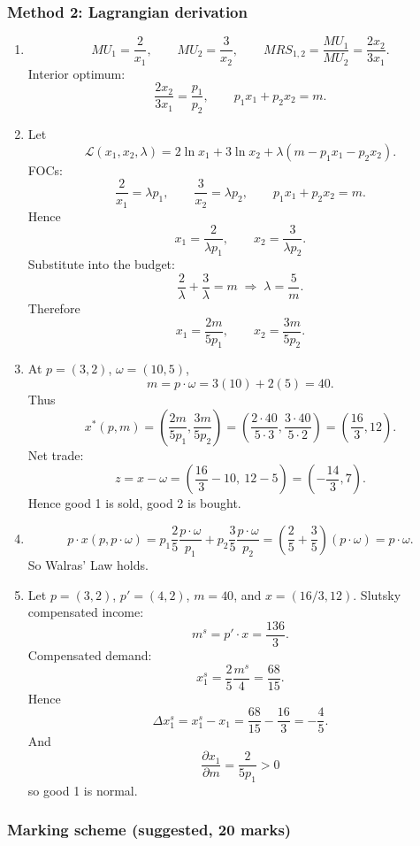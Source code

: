 \documentclass[12pt]{article}
\begin{document}
\newpage
\subsubsection*{Method 2: Lagrangian derivation}

\begin{enumerate}[label=(\alph*)]
\item
\[
MU_1=\frac{2}{x_1},\qquad MU_2=\frac{3}{x_2},\qquad
MRS_{1,2}=\frac{MU_1}{MU_2}=\frac{2x_2}{3x_1}.
\]
Interior optimum:
\[
\frac{2x_2}{3x_1}=\frac{p_1}{p_2},
\qquad p_1x_1+p_2x_2=m.
\]

\item Let
\[
\mathcal L(x_1,x_2,\lambda)=2\ln x_1+3\ln x_2+\lambda(m-p_1x_1-p_2x_2).
\]
FOCs:
\[
\frac{2}{x_1}=\lambda p_1,\qquad \frac{3}{x_2}=\lambda p_2,\qquad p_1x_1+p_2x_2=m.
\]
Hence
\[
x_1=\frac{2}{\lambda p_1},\qquad x_2=\frac{3}{\lambda p_2}.
\]
Substitute into the budget:
\[
\frac{2}{\lambda}+\frac{3}{\lambda}=m
\;\Rightarrow\;
\lambda=\frac{5}{m}.
\]
Therefore
\[
\boxed{x_1=\frac{2m}{5p_1},\qquad x_2=\frac{3m}{5p_2}.}
\]

\item At \(p=(3,2)\), \(\omega=(10,5)\),
\[
m=p\cdot\omega=3(10)+2(5)=40.
\]
Thus
\[
x^*(p,m)=\left(\frac{2m}{5p_1},\frac{3m}{5p_2}\right)
=\left(\frac{2\cdot 40}{5\cdot 3},\frac{3\cdot 40}{5\cdot 2}\right)
=\left(\frac{16}{3},12\right).
\]
Net trade:
\[
z=x-\omega=\left(\frac{16}{3}-10,\ 12-5\right)=\left(-\frac{14}{3},7\right).
\]
Hence good 1 is sold, good 2 is bought.

\item
\[
p\cdot x(p,p\cdot\omega)
=p_1\frac{2}{5}\frac{p\cdot\omega}{p_1}+p_2\frac{3}{5}\frac{p\cdot\omega}{p_2}
=\left(\frac25+\frac35\right)(p\cdot\omega)
=p\cdot\omega.
\]
So Walras' Law holds.

\item Let \(p=(3,2)\), \(p'=(4,2)\), \(m=40\), and \(x=(16/3,12)\). Slutsky compensated income:
\[
m^s=p'\cdot x=\frac{136}{3}.
\]
Compensated demand:
\[
x_1^s=\frac{2}{5}\frac{m^s}{4}=\frac{68}{15}.
\]
Hence
\[
\Delta x_1^s=x_1^s-x_1=\frac{68}{15}-\frac{16}{3}=-\frac45.
\]
And
\[
\frac{\partial x_1}{\partial m}=\frac{2}{5p_1}>0
\]
so good 1 is normal.
\end{enumerate}
\newpage
\subsubsection*{Marking scheme (suggested, 20 marks)}
\end{document}
